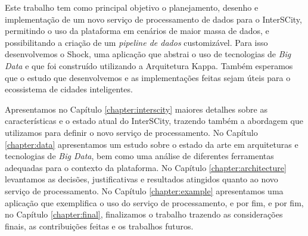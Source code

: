 Este trabalho tem como principal objetivo o planejamento, desenho e
implementação de um novo serviço de processamento de dados para o InterSCity,
permitindo o uso da plataforma em cenários de maior massa de dados, e
possibilitando a criação de um \textit{pipeline de dados} customizável. Para
isso desenvolvemos o Shock, uma aplicação que abstrai o uso de tecnologias
de \textit{Big Data} e que foi construído utilizando a Arquitetura Kappa.
Também esperamos que o estudo que desenvolvemos e as implementações feitas
sejam úteis para o ecossistema de cidades inteligentes.

Apresentamos no Capítulo \ref{chapter:interscity} maiores detalhes sobre as
características e o estado atual do InterSCity, trazendo também a abordagem que
utilizamos para definir o novo serviço de processamento. No Capítulo
\ref{chapter:data} apresentamos um estudo sobre o estado da arte em arquiteturas
e tecnologias de \textit{Big Data}, bem como uma análise de diferentes
ferramentas adequadas para o contexto da plataforma. No Capítulo
\ref{chapter:architecture} levantamos as decisões, justificativas e resultados
atingidos quanto ao novo serviço de processamento. No Capítulo
\ref{chapter:example} apresentamos uma aplicação que exemplifica o uso do serviço
de processamento, e por fim, e por fim, no Capítulo
\ref{chapter:final}, finalizamos o trabalho trazendo as considerações
finais, as contribuições feitas e os trabalhos futuros.
